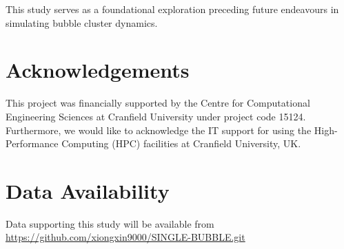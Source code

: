 \documentclass[review]{elsarticle}
\begin{document}
This study serves as a foundational
exploration preceding future endeavours in simulating bubble cluster dynamics.
\section*{Acknowledgements}
This project was financially supported by the Centre for Computational Engineering Sciences at Cranfield University under project code 15124. Furthermore, we would like to acknowledge the IT support for using the High-Performance Computing (HPC) facilities at Cranfield University, UK.
\section*{Data Availability}
Data supporting this study will be available from \url{https://github.com/xiongxin9000/SINGLE-BUBBLE.git}

{\begingroup
\singlespacing
\footnotesize

\endgroup}
\end{document}
